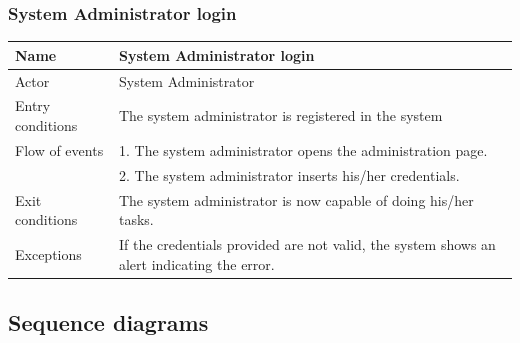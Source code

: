 \subsubsection{System Administrator login}
\begin{table}[!h]
\begin{tabularx}{\linewidth}{l|X}
\centering
Name & System Administrator login \\ \hline
Actor & System Administrator \\ \hline
Entry conditions & The system administrator is registered in the system\\ \hline
Flow of events & 1. The system administrator opens the administration page. \\
& 2. The system administrator inserts his/her credentials.\\ \hline
Exit conditions & The system administrator is now capable of doing his/her tasks. \\ \hline
Exceptions & If the credentials provided are not valid, the system shows an alert indicating the error. \\
\end{tabularx}
\end{table}

\subsection{Sequence diagrams}

